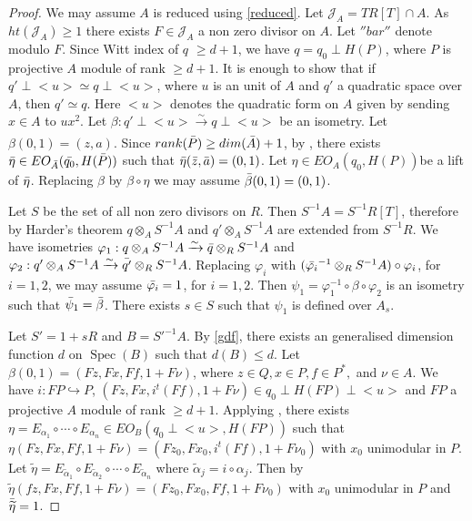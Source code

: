 \documentclass[11pt,a4paper]{amsart}
\theoremstyle{plain}
\theoremstyle{definition}
\theoremstyle{remark}
\begin{document}
\begin{proof}
    We may assume $A$ is reduced using \ref{reduced}. Let $\mathcal{J}_A= TR[T]\cap A$. As $ht(\mathcal{J}_A)\geq 1$ there exists $F\in \mathcal{J}_A$ a non zero divisor on $A$. Let $''bar''$ denote modulo $F$. Since Witt index of $q$ $\geq d+1$, we have $q=q_0\perp H(P)$, where $P$ is projective $A$ module of rank 
    $\geq d+1$.  It is enough to show that if $q'\perp <u>\simeq  q\perp <u>$, where $u$ is an unit of $A$ and $q'$ a quadratic space over $A$, then $q'\simeq q$. Here $<u>$ denotes the quadratic form on $A$ given by sending $x\in A$ to $ux^2$.  Let $\beta: q'\perp <u>\xrightarrow[]{\sim}q\perp <u>$ be an isometry. Let $\beta(0,1)=(z,a)$. Since $rank(\Bar{P})\geq dim(\Bar{A})+1$, by \cite[Corollary 6.4]{roy1968cancellation}, there exists $\Bar{\eta}\in EO_{\Bar{A}}(\Bar{q_0}, H(\Bar{P}))$ such that $\Bar{\eta}(\Bar{z},\Bar{a})=(0,1)$. Let $\eta\in EO_A(q_0,H(P)) $be a lift of $\Bar{\eta}$. Replacing $\beta$ by $\beta\circ\eta$ we may assume $\Bar{\beta}(0,1)=(0,1)$. 

    Let $S$ be the set of all non zero divisors on $R$. Then $S^{-1}A=S^{-1}R[T]$, therefore by Harder's theorem \cite[Theorem 3.13, p.~246]{lam2006serre} $q\otimes_A S^{-1}A$ and $q'\otimes_A S^{-1}A$ are extended from $S^{-1}R$. We have isometries $\varphi_1:q\otimes_A S^{-1}A\xrightarrow[]{\sim}\Bar{q}\otimes_{R}S^{-1}A$ and $\varphi_2:q'\otimes_A S^{-1}A\xrightarrow[]{\sim}\Bar{q'}\otimes_{R}S^{-1}A$. Replacing $\varphi_i$ with $(\Bar{\varphi_i}^{-1}\otimes_RS^{-1}A)\circ \varphi_i$, for $i=1,2$, we may assume $\Bar{\varphi_i}=1$, for $i=1,2$. Then $\psi_1=\varphi_1^{-1}\circ \beta \circ \varphi_2$ is an isometry such that $\Bar{\psi}_1=\Bar{\beta}$. There exists $s\in S$ such that $\psi_1$ is defined over $A_s$.

  Let $S'=1+sR$ and $B=S'^{-1}A$. By \ref{gdf}, there exists an generalised dimension function $d$ on $\operatorname{Spec}(B)$ such that $d(B)\leq d$. Let  $\beta(0,1)=(Fz, Fx, Ff, 1+F\nu)$, where $z \in Q, x\in P, f \in P^*,$ and $\nu\in A$. 
  We have $i: FP\hookrightarrow P$, $(Fz,Fx,i^t(Ff), 1+F\nu)\in q_0\perp H(FP)\perp <u>$ and $FP$ a projective $A$ module of rank $\geq d+1$. Applying \cite[Theorem 3.1]{parimala1984cancellation}, there exists $\eta=E_{\alpha_1}\circ\cdots\circ E_{\alpha_n}\in EO_B(q_0\perp <u>, H(FP))$ such that $\eta(Fz,Fx,Ff,1+F\nu)=(Fz_0, Fx_0, i^t(Ff), 1+F\nu_0) $ with $x_0$ unimodular in $P$.
  Let $\widetilde{\eta}=E_{\widetilde{\alpha}_1}\circ E_{\widetilde{\alpha}_2}\circ \cdots \circ E_{\widetilde{\alpha}_n}$ where $\widetilde{\alpha}_j=i\circ \alpha_j$. 
  Then by \cite[Lemma 1.1]{parimala1984cancellation} $\widetilde{\eta}(fz,Fx,Ff,1+F\nu)=(Fz_0,Fx_0,Ff,1+F\nu_0)$ with  $x_0$ unimodular in $P$ and $\Bar{\widetilde{\eta}}=1$.
  

\end{proof}
\end{document}
